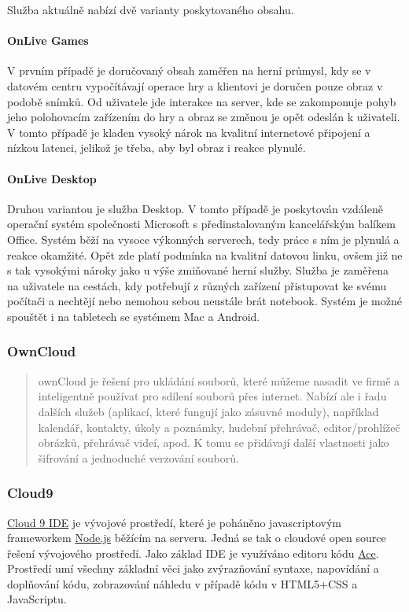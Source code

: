 Služba aktuálně nabízí dvě varianty poskytovaného obsahu.

\paragraph{OnLive Games}
V prvním případě je doručovaný obsah zaměřen na herní průmysl, kdy se v datovém centru vypočítávají operace hry a klientovi je doručen pouze obraz v podobě snímků.
Od uživatele jde interakce na server, kde se zakomponuje pohyb jeho polohovacím zařízením do hry a obraz se změnou je opět odeslán k uživateli. V tomto případě je kladen vysoký nárok na kvalitní internetové připojení a nízkou latenci, jelikož je třeba, aby byl obraz i reakce plynulé.
\paragraph{OnLive Desktop}
Druhou variantou je služba Desktop. V tomto případě je poskytován vzdáleně operační systém společnosti Microsoft s předinstalovaným kancelářským balíkem Office. Systém běží na vysoce výkonných serverech, tedy práce s ním je plynulá a reakce okamžité. Opět zde platí podmínka na kvalitní datovou linku, ovšem již ne s tak vysokými nároky jako u výše zmiňované herní služby. Služba je zaměřena na uživatele na cestách, kdy potřebují z různých zařízení přistupovat ke svému počítači a nechtějí nebo nemohou sebou neustále brát notebook. Systém je možné spouštět i na tabletech se systémem Mac a Android.

\subsubsection{OwnCloud}
\begin{quote}ownCloud je řešení pro ukládání souborů, které můžeme nasadit ve firmě a inteligentně používat pro sdílení souborů přes internet. Nabízí ale i řadu dalších služeb (aplikací, které fungují jako zásuvné moduly), například kalendář, kontakty, úkoly a poznámky, hudební přehrávač, editor/prohlížeč obrázků, přehrávač videí, apod. K tomu se přidávají další vlastnosti jako šifrování a jednoduché verzování souborů.\cite{samuraj:ownCLoud5}
\end{quote}

\subsubsection{Cloud9}
\href{https://github.com/ajaxorg/cloud9}{Cloud 9 IDE} je vývojové prostředí, které je poháněno javascriptovým frameworkem \href{http://nodejs.org/}{Node.js} běžícím na serveru. Jedná se tak o cloudové open source řešení vývojového prostředí. Jako základ IDE je využíváno editoru kódu \href{http://ace.c9.io/}{Ace}. Prostředí umí všechny základní věci jako zvýrazňování syntaxe, napovídání a doplňování kódu, zobrazování náhledu v případě kódu v HTML5+CSS a JavaScriptu.

